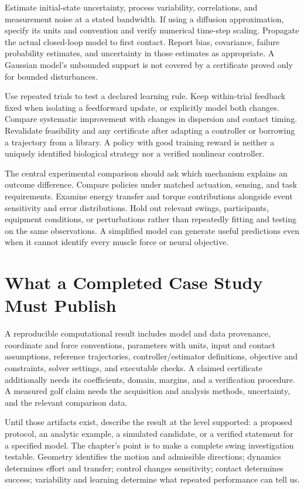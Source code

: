 Estimate initial-state uncertainty, process variability, correlations, and measurement noise at a stated bandwidth. If using a diffusion approximation, specify its units and convention and verify numerical time-step scaling. Propagate the actual closed-loop model to first contact. Report bias, covariance, failure probability estimates, and uncertainty in those estimates as appropriate. A Gaussian model's unbounded support is not covered by a certificate proved only for bounded disturbances.

Use repeated trials to test a declared learning rule. Keep within-trial feedback fixed when isolating a feedforward update, or explicitly model both changes. Compare systematic improvement with changes in dispersion and contact timing. Revalidate feasibility and any certificate after adapting a controller or borrowing a trajectory from a library. A policy with good training reward is neither a uniquely identified biological strategy nor a verified nonlinear controller.

The central experimental comparison should ask which mechanism explains an outcome difference. Compare policies under matched actuation, sensing, and task requirements. Examine energy transfer and torque contributions alongside event sensitivity and error distributions. Hold out relevant swings, participants, equipment conditions, or perturbations rather than repeatedly fitting and testing on the same observations. A simplified model can generate useful predictions even when it cannot identify every muscle force or neural objective.

\section{What a Completed Case Study Must Publish}

A reproducible computational result includes model and data provenance, coordinate and force conventions, parameters with units, input and contact assumptions, reference trajectories, controller/estimator definitions, objective and constraints, solver settings, and executable checks. A claimed certificate additionally needs its coefficients, domain, margins, and a verification procedure. A measured golf claim needs the acquisition and analysis methods, uncertainty, and the relevant comparison data.

Until those artifacts exist, describe the result at the level supported: a proposed protocol, an analytic example, a simulated candidate, or a verified statement for a specified model. The chapter's point is to make a complete swing investigation testable. Geometry identifies the motion and admissible directions; dynamics determines effort and transfer; control changes sensitivity; contact determines success; variability and learning determine what repeated performance can tell us.

